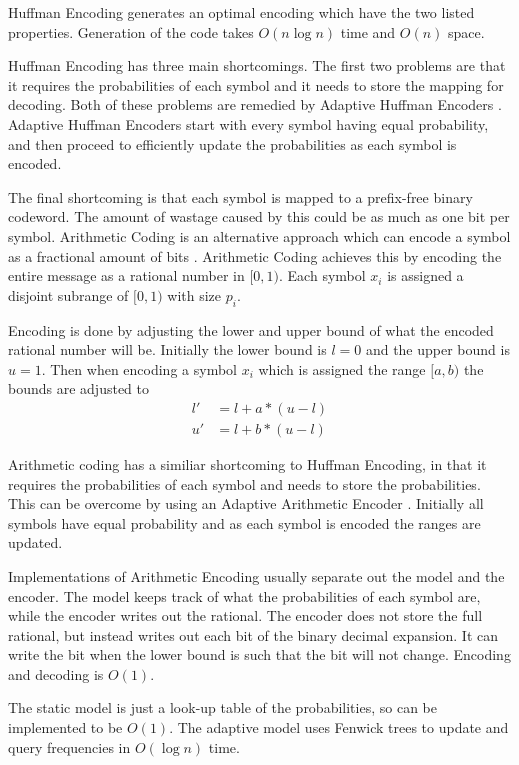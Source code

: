 \documentclass[a4paper]{report}
\begin{document}
Huffman Encoding generates an optimal encoding which have the two listed
properties. Generation of the code takes $O(n \log n)$ time and $O(n)$ space.

Huffman Encoding has three main shortcomings. The first two problems are that
it requires the probabilities of each symbol and it needs to store the mapping
for decoding. Both of these problems are remedied by Adaptive Huffman Encoders
\citep{drozdek,vitter1987}. Adaptive Huffman Encoders start with every symbol
having equal probability, and then proceed to efficiently update the
probabilities as each symbol is encoded.

The final shortcoming is that each symbol is mapped to a prefix-free binary
codeword. The amount of wastage caused by this could be as much as one bit per
symbol. Arithmetic Coding is an alternative approach which can encode a symbol
as a fractional amount of bits \citep{drozdek}. Arithmetic Coding achieves
this by encoding the entire message as a rational number in $[0,1)$. Each
  symbol $x_i$ is assigned a disjoint subrange of $[0,1)$ with size $p_i$.

Encoding is done by adjusting the lower and upper bound of what the encoded
rational number will be. Initially the lower bound is $l=0$ and the upper
bound is $u=1$. Then when encoding a symbol $x_i$ which is assigned the range
$[a,b)$ the bounds are adjusted to
\begin{align*}
  l' & = l + a * (u-l) \\
  u' & = l + b * (u-l)
\end{align*}

Arithmetic coding has a similiar shortcoming to Huffman Encoding, in that it
requires the probabilities of each symbol and needs to store the
probabilities. This can be overcome by using an Adaptive Arithmetic Encoder
\citep{drozdek}. Initially all symbols have equal probability and as each
symbol is encoded the ranges are updated.

Implementations of Arithmetic Encoding usually separate out the model and the
encoder. The model keeps track of what the probabilities of each symbol are,
while the encoder writes out the rational. The encoder does not store the full
rational, but instead writes out each bit of the binary decimal expansion. It
can write the bit when the lower bound is such that the bit will not
change. Encoding and decoding is $O(1)$.

The static model is just a look-up table of the probabilities, so can be
implemented to be $O(1)$. The adaptive model uses Fenwick trees to update and
query frequencies in $O(\log n)$ time.
\end{document}
